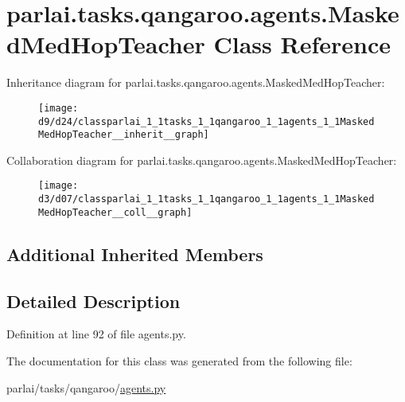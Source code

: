 \hypertarget{classparlai_1_1tasks_1_1qangaroo_1_1agents_1_1MaskedMedHopTeacher}{}\section{parlai.\+tasks.\+qangaroo.\+agents.\+Masked\+Med\+Hop\+Teacher Class Reference}
\label{classparlai_1_1tasks_1_1qangaroo_1_1agents_1_1MaskedMedHopTeacher}


Inheritance diagram for parlai.\+tasks.\+qangaroo.\+agents.\+Masked\+Med\+Hop\+Teacher\+:
\nopagebreak
\begin{figure}[H]
\begin{center}
\leavevmode
\texttt{[image: d9/d24/classparlai\_1\_1tasks\_1\_1qangaroo\_1\_1agents\_1\_1MaskedMedHopTeacher\_\_inherit\_\_graph]}
\end{center}
\end{figure}


Collaboration diagram for parlai.\+tasks.\+qangaroo.\+agents.\+Masked\+Med\+Hop\+Teacher\+:
\nopagebreak
\begin{figure}[H]
\begin{center}
\leavevmode
\texttt{[image: d3/d07/classparlai\_1\_1tasks\_1\_1qangaroo\_1\_1agents\_1\_1MaskedMedHopTeacher\_\_coll\_\_graph]}
\end{center}
\end{figure}
\subsection*{Additional Inherited Members}


\subsection{Detailed Description}


Definition at line 92 of file agents.\+py.



The documentation for this class was generated from the following file\+:\begin{DoxyCompactItemize}
\item 
parlai/tasks/qangaroo/\hyperlink{parlai_2tasks_2qangaroo_2agents_8py}{agents.\+py}\end{DoxyCompactItemize}
